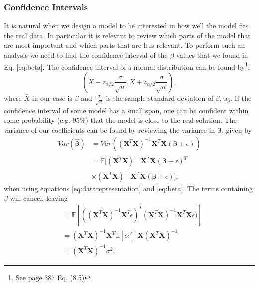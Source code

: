 \documentclass[%
 reprint,
nofootinbib,
 amsmath,amssymb,
 aps,
]{revtex4-2}
\begin{document}
\subsubsection{Confidence Intervals}
It is natural when we design a model to be interested in how well the model fits the real data. In particular it is relevant to review which parts of the model that are most important and which parts that are less relevant. To perform such an analysis we need to find the confidence interval of the $\beta$ values that we found in Eq. \eqref{eq:beta}.
The confidence interval of a normal distribution can be found by\footnote{See \cite{ModernStat} page 387 Eq. (8.5)}:
%
\begin{equation*}\label{eq:CI}
    \left(\bar{X} - z_{\alpha/2}\frac{\sigma}{\sqrt{n}}, \bar{X} + z_{\alpha/2}\frac{\sigma}{\sqrt{n}}\right),
\end{equation*}
%
where $\bar{X}$ in our case is $\beta$ and $\frac{\sigma}{\sqrt{n}}$ is the sample standard deviation of $\beta$, $s_{\beta}$.
If the confidence interval of some model has a small span, one can be confident within some probability (e.g. $95\%$) that the model is close to the real solution.
The variance of our coefficients can be found by reviewing the variance in $\boldsymbol{{\beta}}$, given by
%
\begin{align*}
    Var(\boldsymbol{\hat{\beta}}) &= Var((\boldsymbol{X}^{T}\boldsymbol{X})^{-1}\boldsymbol{X}^{T}\boldsymbol{X}(\boldsymbol{\beta} + \epsilon))\\
    &= \mathbb{E}[(\boldsymbol{X}^{T}\boldsymbol{X})^{-1}\boldsymbol{X}^{T}\boldsymbol{X}(\boldsymbol{\beta} + \epsilon)^T\\
    &\times (\boldsymbol{X}^{T}\boldsymbol{X})^{-1}\boldsymbol{X}^{T}\boldsymbol{X}(\boldsymbol{\beta} + \epsilon)],
\end{align*}
%
when using equations \eqref{eq:datarepresentation} and \eqref{eq:beta}. The terms containing $\beta$ will cancel, leaving
\begin{align*}
    &= \mathbb{E}[((\boldsymbol{X}^{T}\boldsymbol{X})^{-1}\boldsymbol{X}^{T}\epsilon)^{T} (\boldsymbol{X}^{T}\boldsymbol{X})^{-1}\boldsymbol{X}^{T}\boldsymbol{X} \epsilon)]\\
    &= (\boldsymbol{X}^{T}\boldsymbol{X})^{-1} \boldsymbol{X}^{T} \mathbb{E}[\epsilon \epsilon^{T}] \boldsymbol{X} (\boldsymbol{X}^{T}\boldsymbol{X})^{-1}\\
    &= (\boldsymbol{X}^{T}\boldsymbol{X})^{-1} \sigma^{2}.
\end{align*}
%
\end{document}

